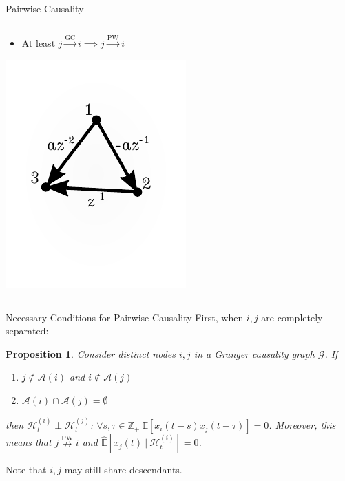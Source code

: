 \documentclass{beamer} %
\newtheorem*{proposition}{Proposition}
\def\E{\mathbb{E}}  %
\def\gc{\overset{\text{GC}}{\rightarrow}}  %
\def\pwgc{\overset{\text{PW}}{\rightarrow}}  %
\def\npwgc{\overset{\text{PW}}{\nrightarrow}}  %
\def\gcg{\mathcal{G}}  %
\def\H{\mathcal{H}}  %
\def\Z{\mathbb{Z}}  %
\newcommand{\linE}[2]{\hat{\E}[#1\ |\ #2]}  %
\newcommand{\anc}[1]{\mathcal{A}(#1)}  %
\begin{document}
\begin{frame}{Pairwise Causality}
\begin{columns}
    \begin{column}{0.5\textwidth}
      \begin{itemize}
        \item{At least $j \gc i \implies j \pwgc i$}\pause
      \end{itemize}
      \includegraphics[width=0.75\linewidth]{../../figures/example2.pdf}
    \end{column}
  \end{columns}
\end{frame}

\begin{frame}{Necessary Conditions for Pairwise Causality}
  First, when $i, j$ are completely separated:

  \begin{proposition}
    Consider distinct nodes $i, j$ in a Granger causality graph
    $\gcg$.  If

    \begin{enumerate}
      \item{$j \not\in \anc{i}$ and $i \not\in \anc{j}$}\pause
      \item{$\anc{i}\cap\anc{j} = \emptyset$}\pause
    \end{enumerate}

    then $\H_t^{(i)} \perp \H_t^{(j)}$: $\forall s, \tau \in \Z_+\ \E[x_i(t - s)x_j(t - \tau)] = 0$.
    \pause  Moreover, this means that $j \npwgc i$ and $\linE{x_j(t)}{\H_t^{(i)}} = 0$.\pause
  \end{proposition}

  Note that $i, j$ may still share descendants.
\end{frame}
\end{document}
